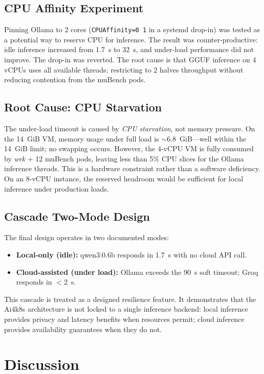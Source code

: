 \subsection{CPU Affinity Experiment}
Pinning Ollama to 2 cores (\texttt{CPUAffinity=0 1} in a systemd drop-in) was
tested as a potential way to reserve CPU for inference. The result was
counter-productive: idle inference increased from 1.7~s to 32~s, and
under-load performance did not improve. The drop-in was reverted. The root cause
is that GGUF inference on 4 vCPUs uses all available threads; restricting to 2
halves throughput without reducing contention from the muBench pods.

\subsection{Root Cause: CPU Starvation}
The under-load timeout is caused by \textit{CPU starvation}, not memory pressure.
On the 14~GiB VM, memory usage under full load is $\sim$6.8~GiB—well within the
14~GiB limit; no swapping occurs. However, the 4-vCPU VM is fully consumed by
\textit{wrk} + 12 muBench pods, leaving less than 5\% CPU slices for the Ollama
inference threads. This is a hardware constraint rather than a software deficiency.
On an 8-vCPU instance, the reserved headroom would be sufficient for local
inference under production loads.

\subsection{Cascade Two-Mode Design}
The final design operates in two documented modes:
\begin{itemize}
  \item \textbf{Local-only (idle):} qwen3:0.6b responds in 1.7~s with no cloud
  API call.
  \item \textbf{Cloud-assisted (under load):} Ollama exceeds the 90~s soft
  timeout; Groq responds in $<$2~s.
\end{itemize}
This cascade is treated as a designed resilience feature. It demonstrates that
the Ai4k8s architecture is not locked to a single inference backend: local
inference provides privacy and latency benefits when resources permit; cloud
inference provides availability guarantees when they do not.

\section{Discussion}
\label{sec:discussion}

